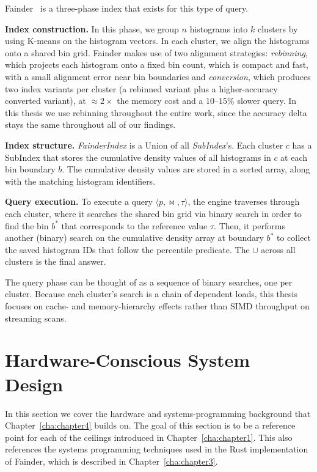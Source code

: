 Fainder~\cite{behme_2024} is a three-phase index that exists for this type of query.

\textbf{Index construction.} In this phase, we group $n$ histograms into $k$ clusters by using K-means on the histogram vectors. In each cluster, we align the histograms onto a shared bin grid. Fainder makes use of two alignment strategies: \emph{rebinning}, which projects each histogram onto a fixed bin count, which is compact and fast, with a small alignment error near bin boundaries and \emph{conversion}, which produces two index variants per cluster (a rebinned variant plus a higher-accuracy converted variant), at $\approx 2\times$ the memory cost and a $10$--$15\%$ slower query. In this thesis we use rebinning throughout the entire work, since the accuracy delta stays the same throughout all of our findings.

\textbf{Index structure.} \emph{FainderIndex} is a Union of all \emph{SubIndex}'s. Each cluster $c$ has a SubIndex that stores the cumulative density values of all histograms in $c$ at each bin boundary $b$. The cumulative density values are stored in a sorted array, along with the matching histogram identifiers. 

\textbf{Query execution.} To execute a query $\langle p, \bowtie, \tau \rangle$, the engine traverses through each cluster, where it searches the shared bin grid via binary search in order to find the bin $b^*$ that corresponds to the reference value $\tau$. Then, it performs another (binary) search on the cumulative density array at boundary $b^*$ to collect the saved histogram IDs that follow the percentile predicate. The $\cup$ across all clusters is the final answer.

The query phase can be thought of as a sequence of binary searches, one per cluster. Because each cluster's search is a chain of dependent loads, this thesis focuses on cache- and memory-hierarchy effects rather than SIMD throughput on streaming scans.

\section{Hardware-Conscious System Design\label{sec:bg:hardware}}

In this section we cover the hardware and systems-programming background that Chapter~\ref{cha:chapter4} builds on. The goal of this section is to be a reference point for each of the ceilings introduced in Chapter~\ref{cha:chapter1}. This also references the systems programming techniques used in the Rust implementation of Fainder, which is described in Chapter~\ref{cha:chapter3}.


